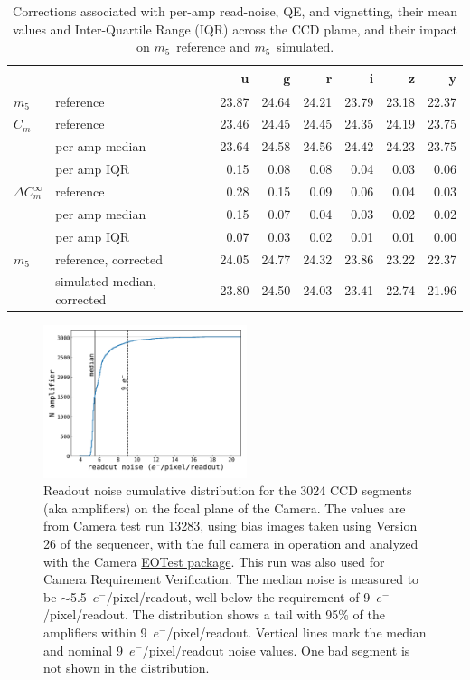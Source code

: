 \documentclass[PST,authoryear,toc]{lsstdoc}
\newcommand{\cm}{\ensuremath{C_m}}
\newcommand{\mf}{\ensuremath{m_5}}
\begin{document}
\FloatBarrier

\begin{table}\caption{Corrections associated with per-amp read-noise, QE, and vignetting, their mean values and Inter-Quartile Range (IQR) across the CCD plame, and their impact on \mf\ reference and \mf\ simulated.}\label{tab:bl3}
    \centering
 \begin{tabular}{llrrrrrr}
 \hline
 {} & &             u &      g &  r &   i &     z &      y \\
\hline
\mf &  reference &  23.87 &  24.64 &  24.21 &  23.79 &  23.18 &  22.37 \\
\hline
\hline
\cm & reference &  23.46 &  24.45 &  24.45 &  24.35 &  24.19 &  23.75 \\
 &per amp median       &  23.64 &  24.58 &  24.56 &  24.42 &  24.23 &  23.75 \\
& per amp IQR          &   0.15 &   0.08 &   0.08 &   0.04 &   0.03 &   0.06 \\
\hline
 $\Delta C_m^\infty$ & reference       &   0.28 &   0.15 &   0.09 &   0.06 &   0.04 &   0.03 \\
 & per amp median  &   0.15 &   0.07 &   0.04 &   0.03 &   0.02 &   0.02 \\
 & per amp IQR     &   0.07 &   0.03 &   0.02 &   0.01 &   0.01 &   0.00 \\
  \hline
  \hline
\mf & reference, corrected       &  24.05 &  24.77 &  24.32 &  23.86 &  23.22 &  22.37 \\
&simulated median, corrected    &  23.80 &  24.50 &  24.03 &  23.41 &  22.74 &  21.96 \\
\end{tabular}
\end{table}
\FloatBarrier
\clearpage

\FloatBarrier
\begin{figure}[!ht]
\centering
\includegraphics[width=0.53\textwidth]{figures/ampnoise.pdf}
\caption{Readout noise cumulative distribution for the 3024 CCD segments (aka amplifiers) on the focal plane of the Camera. The values are from Camera test run 13283, using bias images taken using Version 26 of the sequencer, with the full camera in operation and analyzed with the Camera \href{https://github.com/lsst-camera-dh/eotest}{EOTest package}. This run was also used for Camera Requirement Verification. The median noise is measured to be $\sim$5.5~$e^-$/pixel/readout, well below the requirement of 9~$e^-$/pixel/readout. The distribution shows a tail with 95\% of the amplifiers within 9~$e^-$/pixel/readout. Vertical lines mark the median and nominal 9~$e^-$/pixel/readout noise values. One bad segment is not shown in the distribution.}\label{fig:rndist}
\end{figure}
\end{document}
